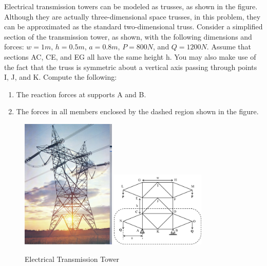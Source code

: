 
Electrical transmission towers can be modeled as trusses, as shown in the figure. Although they are actually
three-dimensional space trusses, in this problem, they can be approximated as the standard two-dimensional
truss. Consider a simplified section of the transmission tower, as shown, with the following dimensions
and forces: $w = 1m$, $h = 0.5m$, $a = 0.8m$, $P = 800N$, and $Q = 1200N$. Assume that sections AC, CE, and EG
all have the same height h. You may also make use of the fact that the truss is symmetric about a vertical axis
passing through points I, J, and K. Compute the following:
\begin{enumerate}
  \item The reaction forces at supports A and B.
  \item The forces in all members enclosed by the dashed region shown in the figure.
\end{enumerate}

\begin{figure}[ht!]
  \centering
  \includegraphics[width=0.4\textwidth,
	           height=0.4\textheight,
		   keepaspectratio]{figa.png}
  \includegraphics[width=0.4\textwidth,
	           height=0.4\textheight,
		   keepaspectratio]{figb.png}
  \caption*{Electrical Transmission Tower}
\end{figure}

